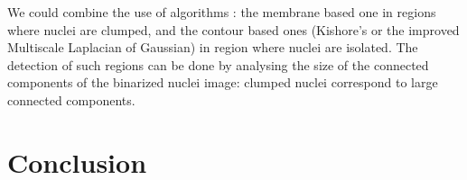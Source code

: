 We could combine the use of algorithms : the membrane based one in regions where nuclei are clumped, and the contour based ones (Kishore's or the improved Multiscale Laplacian of Gaussian) in region where nuclei are isolated.
The detection of such regions can be done by analysing the size of the connected components of the binarized nuclei image:
clumped nuclei correspond to large connected components.

\section*{Conclusion}


%
%





